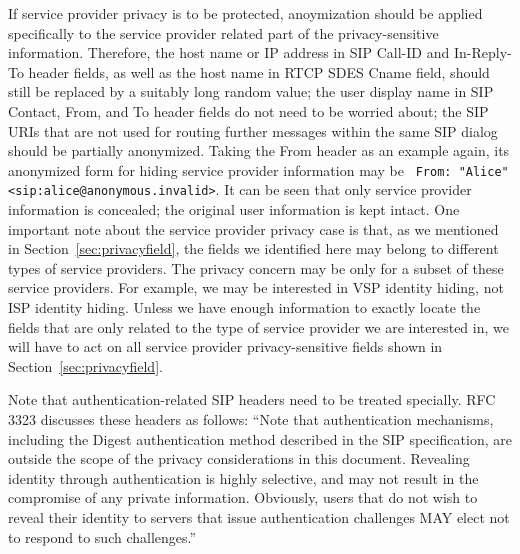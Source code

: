 \documentclass[letterpaper,notitlepage,times,12pt]{article}
\begin{document}
If service provider privacy is to be protected, anoymization should be applied specifically to the service provider related part of the privacy-sensitive information. Therefore, the host name or IP address in SIP {\sf Call-ID} and {\sf In-Reply-To} header fields, as well as the host name in RTCP SDES {\sf Cname} field, should still be replaced by a suitably long random value; the user display name in SIP {\sf Contact}, {\sf From}, and {\sf To} header fields do not need to be worried about; the SIP URIs that are not used for routing further messages within the same SIP dialog should be partially anonymized. Taking the {\sf From} header as an example again, its anonymized form for hiding service provider information may be \verb# From: "Alice" <sip:alice@anonymous.invalid>#. It can be seen that only service provider information is concealed; the original user information is kept intact. One important note about the service provider privacy case is that, as we mentioned in Section~\ref{sec:privacyfield}, the fields we identified here may belong to different types of service providers. The privacy concern may be only for a subset of these service providers. For example, we may be interested in VSP identity hiding, not ISP identity hiding. Unless we have enough information to exactly locate the fields that are only related to the type of service provider we are interested in, we will have to act on all service provider privacy-sensitive fields shown in Section~\ref{sec:privacyfield}.


Note that authentication-related SIP headers need to be treated specially. RFC 3323 discusses these headers as follows: ``Note that authentication mechanisms, including the Digest authentication method described in the SIP specification, are outside the scope of the privacy considerations in this document. Revealing identity through authentication is highly selective, and may not result in the compromise of any private information. Obviously, users that do not wish to reveal their identity to servers that issue authentication challenges MAY elect not to respond to such challenges.''
\end{document}
